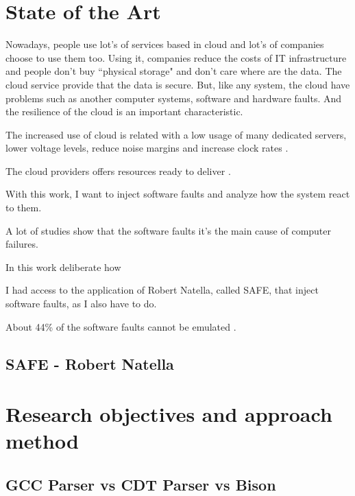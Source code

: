 \newpage
\section{State of the Art}

Nowadays, people use lot's of services based in cloud and lot's of companies choose to use them too. Using it, companies reduce the costs of IT infrastructure and people don't buy ``physical storage" and don't care where are the data. The cloud service provide that the data is secure.
But, like any system, the cloud have problems such as another computer systems, software and hardware faults. And the resilience of the cloud is an important characteristic.

The increased use of cloud is related with a low usage of many dedicated servers, lower voltage levels, reduce noise margins and increase clock rates \cite{wolter2012resilience}.

The cloud providers offers resources ready to deliver \cite{wolter2012resilience}.

With this work, I want to inject software faults and analyze how the system react to them.

A lot of studies show that the software faults it's the main cause of computer failures.

In this work
deliberate how 

I had access to the application of Robert Natella, called SAFE, that inject software faults, as I also have to do.

\cite{duraes2006emulation}
\cite{avizzienisbasic}

About 44\% of the software faults cannot be emulated \cite{madeira2000emulation}.

\subsection{SAFE - Robert Natella}



\newpage
\section{Research objectives and approach method}

\subsection{GCC Parser vs CDT Parser vs Bison}


